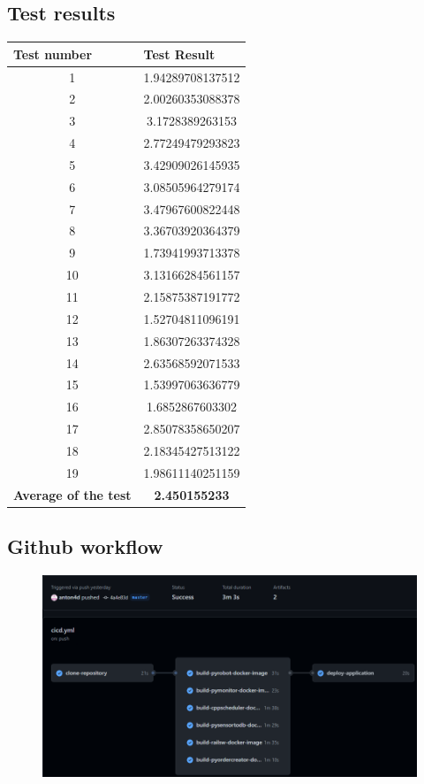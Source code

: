 \subsection{Test results}
\label{sec:testresults}
\vspace{1em}
\begin{center}
    \begin{table}[H]
\begin{tabular}{|c|c|}
\hline
\multicolumn{1}{|l|}{Test number} & \multicolumn{1}{l|}{Test Result} \\ \hline
1 & 1.94289708137512 \\ \hline
2 & 2.00260353088378 \\ \hline
3 & 3.1728389263153 \\ \hline
4 & 2.77249479293823 \\ \hline
5 & 3.42909026145935 \\ \hline
6 & 3.08505964279174 \\ \hline
7 & 3.47967600822448 \\ \hline
8 & 3.36703920364379 \\ \hline
9 & 1.73941993713378 \\ \hline
10 & 3.13166284561157 \\ \hline
11 & 2.15875387191772 \\ \hline
12 & 1.52704811096191 \\ \hline
13 & 1.86307263374328 \\ \hline
14 & 2.63568592071533 \\ \hline
15 & 1.53997063636779 \\ \hline
16 & 1.6852867603302 \\ \hline
17 & 2.85078358650207 \\ \hline
18 & 2.18345427513122 \\ \hline
19 & 1.98611140251159 \\ \hline
\multicolumn{1}{|l|}{\textbf{Average of the test}} & \textbf{2.450155233} \\ \hline
\end{tabular}
\end{table}
\end{center}


\subsection{Github workflow}
\label{sec:github_workflow}
\begin{figure}[H]
    \centering
    \includegraphics[width=0.8\linewidth]{Images/Github-Workflow.png}
    \label{fig:systemdiagram}
\end{figure}



